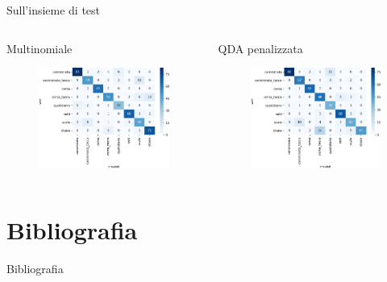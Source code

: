 \documentclass{beamer}
\begin{document}
\begin{frame}{Sull'insieme di test}
\begin{columns}[T] %
\begin{column}{.5\textwidth}
\begin{center}
\small{Multinomiale}
\end{center}
\begin{figure}[H]
\includegraphics[width=\textwidth]{../figure/confusionMatrix-Mn-test.png}
\end{figure}
\end{column}%
\hfill%
\begin{column}{.5\textwidth}
\begin{center}
QDA penalizzata
\end{center}
\begin{figure}[H]
\includegraphics[width=\textwidth]{../figure/confusionMatrix-QDA-penalizzata-test.png}
\end{figure}
\end{column}%
\end{columns}
\end{frame}

\section{Bibliografia}
\begin{frame}{Bibliografia}
\printbibliography
\end{frame}
\end{document}
